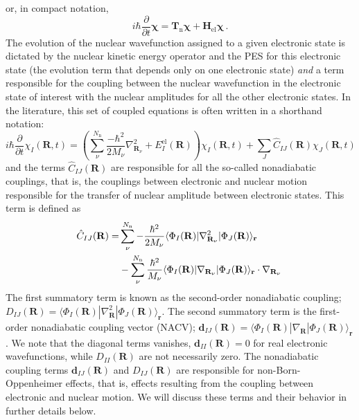 \documentclass[9pt,bestpractices,pubversion]{livecoms}
\newcommand{\bra}[1]{\langle #1|}
\newcommand{\ket}[1]{|#1\rangle}
\newcommand{\bs}{\mathbf}
\begin{document}
or, in compact notation,
\begin{equation} 
 i\hbar \frac{\partial}{\partial t} \boldsymbol{\chi} = \textbf{T}_\text{n} \boldsymbol{\chi} + \textbf{H}_\text{el}  \boldsymbol{\chi}
    \, .
\label{eq:matrixtdsecomp}
\end{equation}
The evolution of the nuclear wavefunction assigned to a given electronic state is dictated by the nuclear kinetic energy operator and the PES for this electronic state (the evolution term that depends only on one electronic state) \textit{and} a term responsible for the coupling between the nuclear wavefunction in the electronic state of interest with the nuclear amplitudes for all the other electronic states. In the literature, this set of coupled equations is often written in a shorthand notation:
\begin{equation}
i\hbar\frac{\partial}{\partial t} \chi_I(\mathbf{R},t)  = \left(\sum_\nu^{N_{\text{n}}}\frac{-\hbar^2}{2M_\nu} \nabla_{\mathbf{R}_\nu}^2 + E^{\text{el}}_{I}(\mathbf{R})\right)\chi_I(\mathbf{R},t) + \sum_J \hat{C}_{IJ}(\mathbf{R}) \chi_J(\mathbf{R},t) \, 
\label{eq:tdseBH}
\end{equation}
and the terms $\hat{C}_{IJ}(\mathbf{R})$ are responsible for all the so-called nonadiabatic couplings, that is, the couplings between electronic and nuclear motion responsible for the transfer of nuclear amplitude between electronic states. This term is defined as
\begin{align}
 \hat{C}_{IJ}(\mathbf{R}) = &  \sum_\nu^{N_{\text{n}}}-\frac{\hbar^2}{2M_\nu}\bra{\Phi_I(\mathbf{R})}\nabla_{\mathbf{R_\nu}}^2\ket{\Phi_J(\mathbf{R})}_{\mathbf{r}} \notag \\ 
 & -\sum_\nu^{N_{\text{n}}}\frac{\hbar^2}{M_\nu} \bra{\Phi_I(\mathbf{R})}\nabla_{\mathbf{R_\nu}}\ket{\Phi_J(\mathbf{R})}_{\bs r}\cdot\nabla_{\mathbf{R}_\nu} \, 
\label{eq:tdseBH2}
\end{align}
The first summatory term is known as the second-order nonadiabatic coupling; $D_{IJ}(\mathbf{R})=\bra{\Phi_I(\mathbf{R})}\nabla_{\mathbf{R}}^2\ket{\Phi_J(\mathbf{R})}_{\mathbf{r}}$. The second summatory term is the first-order nonadiabatic coupling vector (NACV); $\mathbf{d}_{IJ}(\mathbf{R})=\bra{\Phi_I(\mathbf{R})}\nabla_{\mathbf{R}}\ket{\Phi_J(\mathbf{R})}_{\bs r}$. We note that the diagonal terms vanishes, $\mathbf{d}_{II}(\mathbf{R})=0$ for real electronic wavefunctions, while $D_{II}(\mathbf{R})$ are not necessarily zero. The nonadiabatic coupling terms $\mathbf{d}_{IJ}(\mathbf{R})$ and $D_{IJ}(\mathbf{R})$ are responsible for non-Born-Oppenheimer effects, that is, effects resulting from the coupling between electronic and nuclear motion. We will discuss these terms and their behavior in further details below.
\end{document}
